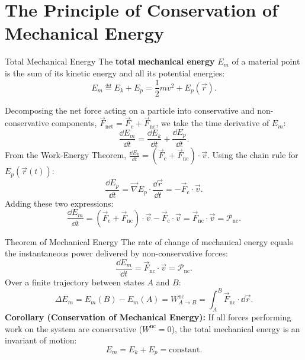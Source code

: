 \section{The Principle of Conservation of Mechanical Energy}

\begin{definitionbox}{Total Mechanical Energy}
The \textbf{total mechanical energy} $E_m$ of a material point is the sum of its kinetic energy and all its potential energies:
\begin{equation}
E_m \eqdef E_k + E_p = \frac{1}{2}m v^2 + E_p(\vec{r}).
\end{equation}
\end{definitionbox}

Decomposing the net force acting on a particle into conservative and non-conservative components, $\vec{F}_{\text{net}} = \vec{F}_{\text{c}} + \vec{F}_{\text{nc}}$, we take the time derivative of $E_m$:
\[
\frac{\dd E_m}{\dd t} = \frac{\dd E_k}{\dd t} + \frac{\dd E_p}{\dd t}.
\]
From the Work-Energy Theorem, $\frac{\dd E_k}{\dd t} = (\vec{F}_{\text{c}} + \vec{F}_{\text{nc}})\cdot\vec{v}$. Using the chain rule for $E_p(\vec{r}(t))$:
\[
\frac{\dd E_p}{\dd t} = \vec{\nabla} E_p \cdot \frac{\dd\vec{r}}{\dd t} = -\vec{F}_{\text{c}} \cdot \vec{v}.
\]
Adding these two expressions:
\[
\frac{\dd E_m}{\dd t} = (\vec{F}_{\text{c}} + \vec{F}_{\text{nc}})\cdot\vec{v} - \vec{F}_{\text{c}}\cdot\vec{v} = \vec{F}_{\text{nc}} \cdot \vec{v} = \mathcal{P}_{\text{nc}}.
\]

\begin{lawbox}{Theorem of Mechanical Energy}
The rate of change of mechanical energy equals the instantaneous power delivered by non-conservative forces:
\begin{equation}
\frac{\dd E_m}{\dd t} = \vec{F}_{\text{nc}} \cdot \vec{v} = \mathcal{P}_{\text{nc}}.
\end{equation}
Over a finite trajectory between states $A$ and $B$:
\begin{equation}
\Delta E_m = E_m(B) - E_m(A) = W_{A \to B}^{\text{nc}} = \int_A^B \vec{F}_{\text{nc}} \cdot \dd\vec{r}.
\end{equation}
\textbf{Corollary (Conservation of Mechanical Energy):} If all forces performing work on the system are conservative ($W^{\text{nc}} = 0$), the total mechanical energy is an invariant of motion:
\begin{equation}
E_m = E_k + E_p = \text{constant}.
\end{equation}
\end{lawbox}

